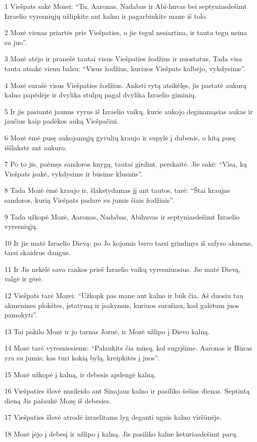 \par 1 Viešpats sakė Mozei: “Tu, Aaronas, Nadabas ir Abi-huvas bei septyniasdešimt Izraelio vyresniųjų užlipkite ant kalno ir pagarbinkite mane iš tolo. 
\par 2 Mozė vienas priartės prie Viešpaties, o jie tegul nesiartina, ir tauta tegu neina su juo”. 
\par 3 Mozė atėjo ir pranešė tautai visus Viešpaties žodžius ir nuostatus. Tada visa tauta atsakė vienu balsu: “Visus žodžius, kuriuos Viešpats kalbėjo, vykdysime”. 
\par 4 Mozė surašė visus Viešpaties žodžius. Anksti rytą atsikėlęs, jis pastatė aukurą kalno papėdėje ir dvylika stulpų pagal dvylika Izraelio giminių. 
\par 5 Ir jis pasiuntė jaunus vyrus iš Izraelio vaikų, kurie aukojo deginamąsias aukas ir jaučius kaip padėkos auką Viešpačiui. 
\par 6 Mozė ėmė pusę aukojamųjų gyvulių kraujo ir supylė į dubenis, o kitą pusę iššlakstė ant aukuro. 
\par 7 Po to jis, paėmęs sandoros knygą, tautai girdint, perskaitė. Jie sakė: “Visa, ką Viešpats įsakė, vykdysime ir būsime klusnūs”. 
\par 8 Tada Mozė ėmė kraujo ir, šlakstydamas jį ant tautos, tarė: “Štai kraujas sandoros, kurią Viešpats padarė su jumis šiais žodžiais”. 
\par 9 Tada užkopė Mozė, Aaronas, Nadabas, Abihuvas ir septyniasdešimt Izraelio vyresniųjų. 
\par 10 Ir jie matė Izraelio Dievą: po Jo kojomis buvo tarsi grindinys iš safyro akmens, tarsi skaidrus dangus. 
\par 11 Ir Jis nekėlė savo rankos prieš Izraelio vaikų vyresniuosius. Jie matė Dievą, valgė ir gėrė. 
\par 12 Viešpats tarė Mozei: “Užkopk pas mane ant kalno ir būk čia. Aš duosiu tau akmenines plokštes, įstatymą ir įsakymus, kuriuos surašiau, kad galėtum juos pamokyti”. 
\par 13 Tai pakilo Mozė ir jo tarnas Jozuė, ir Mozė užlipo į Dievo kalną. 
\par 14 Mozė tarė vyresniesiems: “Palaukite čia mūsų, kol sugrįšime. Aaronas ir Hūras yra su jumis; kas turi kokią bylą, kreipkitės į juos”. 
\par 15 Mozė užkopė į kalną, ir debesis apdengė kalną. 
\par 16 Viešpaties šlovė nusileido ant Sinajaus kalno ir pasiliko šešias dienas. Septintą dieną Jis pašaukė Mozę iš debesies. 
\par 17 Viešpaties šlovė atrodė izraelitams lyg deganti ugnis kalno viršūnėje. 
\par 18 Mozė įėjo į debesį ir užlipo į kalną. Jis pasiliko kalne keturiasdešimt parų.



